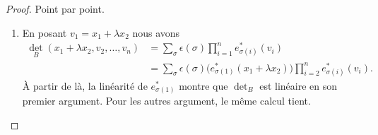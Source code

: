 \begin{proof}
    Point par point.
    \begin{enumerate}
        \item
            En posant \( v_1=x_1+\lambda x_2\) nous avons
            \begin{subequations}
                \begin{align}
                    \det_B(x_1+\lambda x_2,v_2,\ldots, v_n)&=\sum_{\sigma}\epsilon(\sigma)\prod_{i=1}^ne^*_{\sigma(i)}(v_i)\\
                    &=\sum_{\sigma}\epsilon(\sigma)\Big( e^*_{\sigma(1)}(x_1+\lambda x_2) \Big)\prod_{i=2}^ne^*_{\sigma(i)}(v_i).
                \end{align}
            \end{subequations}
            À partir de là, la linéarité de \( e^*_{\sigma(1)}\) montre que \( \det_B\) est linéaire en son premier argument. Pour les autres argument, le même calcul tient.


\end{enumerate}
\end{proof}
